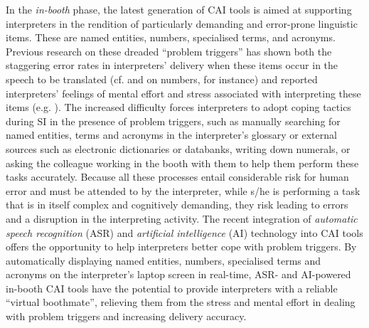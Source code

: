 In the \textit{in-booth} phase, the latest generation of CAI tools is aimed at supporting interpreters in the rendition of particularly demanding and error-prone linguistic items. These are named entities, numbers, specialised terms, and acronyms. Previous research on these dreaded ``problem triggers'' \citep{gile2009basic} has shown both the staggering error rates in interpreters’ delivery when these items occur in the speech to be translated (cf. \citealt{desmet2018simultaneous} and \citealt{frittella2017numeri,frittella2019a} on numbers, for instance) and reported interpreters’ feelings of mental effort and stress associated with interpreting these items (e.g. \citealt{alessandrini1990translating}). The increased difficulty forces interpreters to adopt coping tactics during SI in the presence of problem triggers, such as manually searching for named entities, terms and acronyms in the interpreter’s glossary or external sources such as electronic dictionaries or databanks, writing down numerals, or asking the colleague working in the booth with them to help them perform these tasks accurately. Because all these processes entail considerable risk for human error and must be attended to by the interpreter, while s/he is performing a task that is in itself complex and cognitively demanding, they risk leading to errors and a disruption in the interpreting activity. The recent integration of \textit{automatic speech recognition} (ASR) and \textit{artificial intelligence} (AI) technology into CAI tools offers the opportunity to help interpreters better cope with problem triggers. By automatically displaying named entities, numbers, specialised terms and acronyms on the interpreter’s laptop screen in real-time, ASR- and AI-powered in-booth CAI tools have the potential to provide interpreters with a reliable “virtual boothmate”, relieving them from the stress and mental effort in dealing with problem triggers and increasing delivery accuracy.

